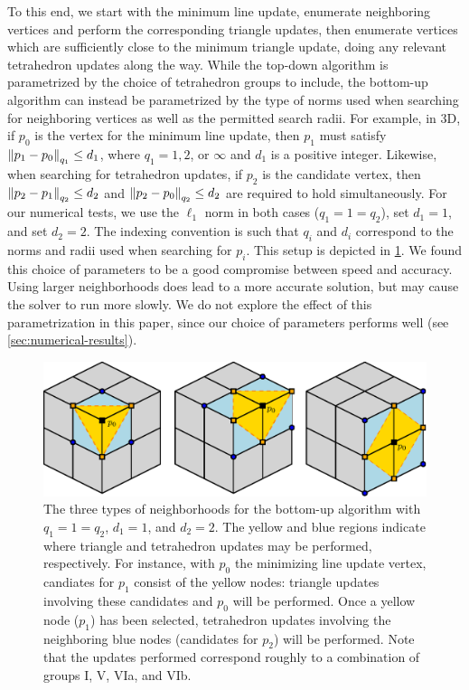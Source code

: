 \documentclass[eikonal.tex]{subfiles}
\begin{document}
To this end, we start with the minimum line update, enumerate
neighboring vertices and perform the corresponding triangle updates,
then enumerate vertices which are sufficiently close to the minimum
triangle update, doing any relevant tetrahedron updates along the
way. While the top-down algorithm is parametrized by the choice of
tetrahedron groups to include, the bottom-up algorithm can instead be
parametrized by the type of norms used when searching for neighboring
vertices as well as the permitted search radii. For example, in 3D, if
$p_0$ is the vertex for the minimum line update, then $p_1$ must
satisfy $\left\|p_1 - p_0\right\|_{q_1} \leq d_1$, where $q_1 = 1, 2$, or
$\infty$ and $d_1$ is a positive integer. Likewise, when searching for
tetrahedron updates, if $p_2$ is the candidate vertex, then
$\left\|p_2 - p_1\right\|_{q_2} \leq d_2$ and
$\left\|p_2 - p_0\right\|_{q_2} \leq d_2$ are required to hold
simultaneously. For our numerical tests, we use the $\ell_1$ norm in
both cases ($q_1 = 1 = q_2$), set $d_1 = 1$, and set $d_2 = 2$. The
indexing convention is such that $q_i$ and $d_i$ correspond to the
norms and radii used when searching for $p_i$. This setup is depicted
in \cref{fig:hu-neighborhoods}. We found this choice of parameters to
be a good compromise between speed and accuracy. Using larger
neighborhoods does lead to a more accurate solution, but may cause the
solver to run more slowly. We do not explore the effect of this
parametrization in this paper, since our choice of parameters performs
well (see \cref{sec:numerical-results}).

\begin{figure}[t]
  \centering
  \includegraphics[width=0.85\linewidth]{hu-neighborhoods.eps}
  \caption{The three types of neighborhoods for the bottom-up
    algorithm with $q_1 = 1 = q_2$, $d_1 = 1$, and $d_2 = 2$. The
    yellow and blue regions indicate where triangle and tetrahedron
    updates may be performed, respectively. For instance, with $p_0$
    the minimizing line update vertex, candiates for $p_1$ consist of
    the yellow nodes: triangle updates involving these candidates and
    $p_0$ will be performed. Once a yellow node ($p_1$) has been
    selected, tetrahedron updates involving the neighboring blue nodes
    (candidates for $p_2$) will be performed. Note that the updates
    performed correspond roughly to a combination of groups I, V, VIa,
    and VIb.}\label{fig:hu-neighborhoods}
\end{figure}
\end{document}
